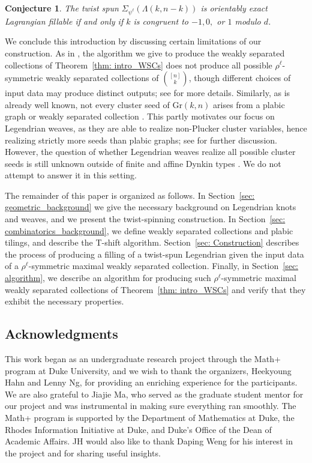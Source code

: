 \documentclass[11pt]{amsart}
\newcommand{\La}{\Lambda}
\newcommand{\Gr}{\text{Gr}}
\theoremstyle{plain}
\newtheorem{conjecture}[theorem]{Conjecture}
\theoremstyle{definition}
\begin{document}
\begin{conjecture}\label{conj: intro_converse}
The twist spun $\Sigma_{\psi^\ell}(\La(k, n-k))$ is orientably exact Lagrangian fillable if and only if $k$ is congruent to $-1, 0,$ or $1$ modulo $d$.
\end{conjecture}


We conclude this introduction by discussing certain limitations of our construction. As in \cite{PasqTZ2019}, the algorithm we give to produce the weakly separated collections of Theorem~\ref{thm: intro_WSCs} does not produce all possible $\rho^\ell$-symmetric weakly separated collections of ${[n]\choose k}$, though different choices of input data may produce distinct outputs; see \cite[Remark 5.5]{PasqTZ2019} for more details. Similarly, as is already well known, not every cluster seed of $\Gr(k, n)$ arises from a plabic graph or weakly separated collection \cite{Fomin7}. This partly motivates our focus on Legendrian weaves, as they are able to realize non-Plucker cluster variables, hence realizing strictly more seeds than plabic graphs; see \cite[Remark 1.1]{CLSW2023} for further discussion. However, the question of whether Legendrian weaves realize all possible cluster seeds is still unknown outside of finite and affine Dynkin types \cite{Hughes2021, ABL22}. We do not attempt to answer it in this setting.

The remainder of this paper is organized as follows. In Section~\ref{sec: geometric_background} we give the necessary background on Legendrian knots and weaves, and we present the twist-spinning construction. In Section~\ref{sec: combinatorics_background}, we define weakly separated collections and plabic tilings, and describe the T-shift algorithm. Section~\ref{sec: Construction} describes the process of producing a filling of a twist-spun Legendrian given the input data of a $\rho^\ell$-symmetric maximal weakly separated collection. Finally, in Section~\ref{sec: algorithm}, we describe an algorithm for producing such $\rho^\ell$-symmetric maximal weakly separated collections of Theorem~\ref{thm: intro_WSCs} and verify that they exhibit the necessary properties. 

\subsection*{Acknowledgments}
This work began as an undergraduate research project through the Math+ program at Duke University, and we wish to thank the organizers, Heekyoung Hahn and Lenny Ng, for providing an enriching experience for the participants. We are also grateful to Jiajie Ma, who served as the graduate student mentor for our project and was instrumental in making sure everything ran smoothly. The Math+ program is supported by the Department of Mathematics at Duke, the Rhodes Information Initiative at Duke, and Duke's Office of the Dean of Academic Affairs. JH would also like to thank Daping Weng for his interest in the project and for sharing useful insights.
\end{document}
